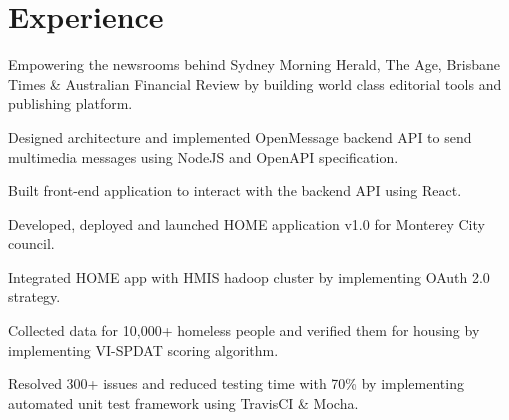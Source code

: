 \documentclass[]{deedy-resume-openfont}
\begin{document}
\begin{minipage}[t]{0.33\textwidth}
%
%

\end{minipage}
\hfill
\begin{minipage}[t]{0.66\textwidth}


\section{Experience}

\vspace{\topsep} %
\begin{tightemize}
\item
  Empowering the newsrooms behind Sydney Morning Herald, The Age, Brisbane Times \&
  Australian Financial Review by building world class editorial tools and publishing platform.
\end{tightemize}
\sectionsep

\begin{tightemize}
\item
  Designed architecture and implemented OpenMessage backend API
  to send multimedia messages using NodeJS and OpenAPI specification.
\item Built front-end application to interact with the backend API using React.
\end{tightemize}
\sectionsep

\begin{tightemize}
\item Developed, deployed and launched HOME application v1.0 for Monterey City council.
\item Integrated HOME app with HMIS hadoop cluster by implementing OAuth 2.0 strategy.
\item
  Collected data for 10,000+ homeless people and verified them for housing
  by implementing VI-SPDAT scoring algorithm.
\item
  Resolved 300+ issues and reduced testing time with 70\%
  by implementing automated unit test framework using TravisCI \& Mocha.
\end{tightemize}
\sectionsep


\end{minipage}
\end{document}
